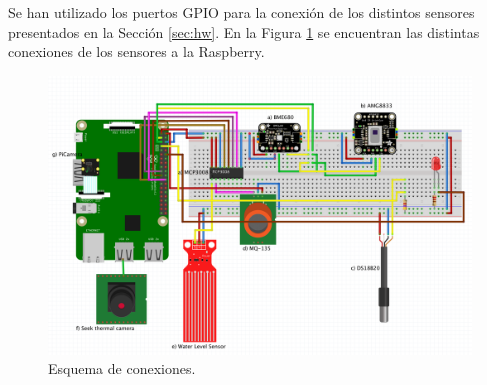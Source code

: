 Se han utilizado los puertos GPIO para la conexión de los distintos sensores presentados en la Sección \ref{sec:hw}. En la Figura \ref{fig:esquema} se encuentran las distintas conexiones de los sensores a la Raspberry.\\
\begin{figure} [h!]
  \begin{center}
    \includegraphics[width=14cm]{figs/esquema}
  \end{center}
  \caption{Esquema de conexiones.}
  \label{fig:esquema}
\end{figure}

